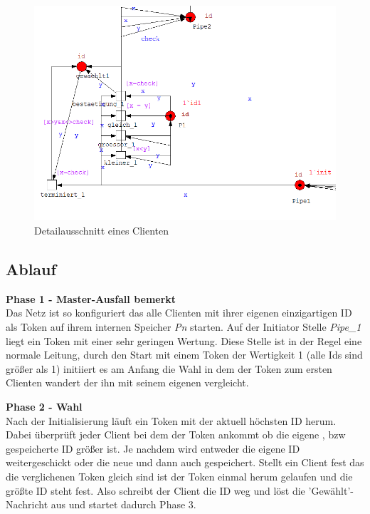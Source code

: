 \begin{figure}[H]
\centering
\includegraphics[width=1\linewidth]{kapitel/hauptteil/img/cpn_detail}
\caption{Detailausschnitt eines Clienten}
\label{fig:cpn_detail}
\end{figure}

\subsection{Ablauf}

\textbf{Phase 1 - Master-Ausfall bemerkt}\\
Das Netz ist so konfiguriert das alle Clienten mit ihrer eigenen einzigartigen ID als Token auf ihrem internen Speicher \textit{Pn} starten. Auf der Initiator Stelle \textit{Pipe\_1} liegt ein Token mit einer sehr geringen Wertung. Diese Stelle ist in der Regel eine normale Leitung, durch den Start mit einem Token der Wertigkeit 1 (alle Ids sind größer als 1) initiiert es am Anfang die Wahl in dem der Token zum ersten Clienten wandert der ihn mit seinem eigenen vergleicht.	

\textbf{Phase 2 - Wahl}\\
Nach der Initialisierung läuft ein Token mit der aktuell höchsten ID herum. Dabei überprüft jeder Client bei dem der Token ankommt ob die eigene , bzw gespeicherte ID größer ist. Je nachdem wird entweder die eigene ID weitergeschickt oder die neue und dann auch gespeichert. Stellt ein Client fest das die verglichenen Token gleich sind ist der Token einmal herum gelaufen und die größte ID steht fest. Also schreibt der Client die ID weg und löst die 'Gewählt'-Nachricht aus und startet dadurch Phase 3.

